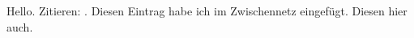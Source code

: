 \documentclass[11pt]{article}
\begin{document}
    Hello. Zitieren: \cite{CitekeyArticle}. Diesen Eintrag habe ich im Zwischennetz eingefügt. Diesen hier auch.



    
    
\end{document}

